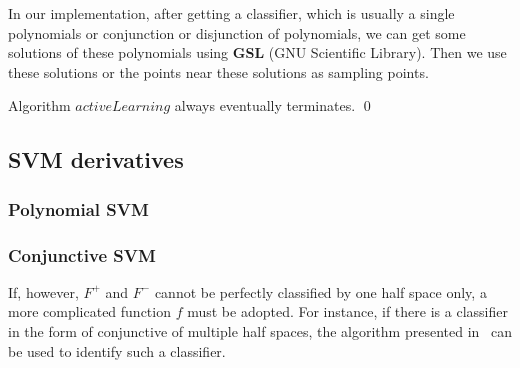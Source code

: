 In our implementation, after getting a classifier, which is usually a single polynomials or conjunction or disjunction of polynomials,
we can get some solutions of these polynomials using \textbf{GSL} (GNU Scientific Library).
Then we use these solutions or the points near these solutions as sampling points.

\begin{example}
\end{example}

\begin{proposition}
Algorithm $activeLearning$ always eventually terminates. \hfill \qed
\end{proposition}


\subsection{SVM derivatives}

\subsubsection{Polynomial SVM}

\subsubsection{Conjunctive SVM}


If, however, $F^+$ and $F^-$ cannot be perfectly classified by one half space only, 
a more complicated function $f$ must be adopted. 
For instance, if there is a classifier in the form of conjunctive of multiple half spaces, 
the algorithm presented in~\cite{Sharma2012} can be used to identify such a classifier.


